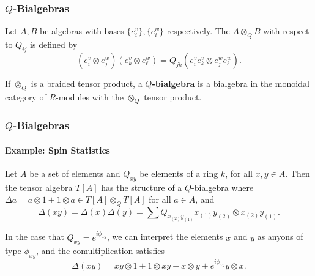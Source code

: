 \documentclass{beamer}
\begin{document}


\begin{frame}


\frametitle{$Q$-Bialgebras}


\begin{definition}
Let $A,B$ be algebras with bases $\{ e^v_i \}, \{ e^w_i \}$ respectively. The  $A \otimes_{Q} B$ with respect to $Q_{ij}$ is defined by
\begin{equation*}
(e^v_i \otimes e^w_j)(e^v_k \otimes e^w_{\ell}) = Q_{jk} (e^v_i e^v_k \otimes e^w_j e^w_\ell).
\end{equation*}
\end{definition}

\begin{definition}
If $\otimes_Q$ is a braided tensor product, a \textbf{$Q$-bialgebra} is a bialgebra in the monoidal category of $R$-modules with the $\otimes_Q$ tensor product.
\end{definition}



\end{frame}



\begin{frame}


\frametitle{$Q$-Bialgebras}

\framesubtitle{Example: Spin Statistics}


Let $A$ be a set of elements and $Q_{x y}$ be elements of a ring $k$, for all $x,y \in A$. Then the tensor algebra $T[A]$ has the structure of a $Q$-bialgebra where $\Delta a = a \otimes 1 + 1 \otimes a \in T[A] \otimes_Q T[A]$ for all $a \in A$, and
\begin{equation}
\Delta(xy) = \Delta(x) \Delta(y) = \sum Q_{x_{(2)} y_{(1)}} x_{(1)} y_{(2)} \otimes x_{(2)} y_{(1)}.
\end{equation}

 In the case that $Q_{xy} = e^{i \phi_{xy}}$, we can interpret the elements $x$ and $y$ as anyons of type $\phi_{xy}$, and the comultiplication satisfies
\begin{equation}
\Delta(xy) = xy \otimes 1 + 1 \otimes xy + x \otimes y + e^{i \phi_{xy}} y \otimes x.
\end{equation}

\end{frame}
\end{document}
